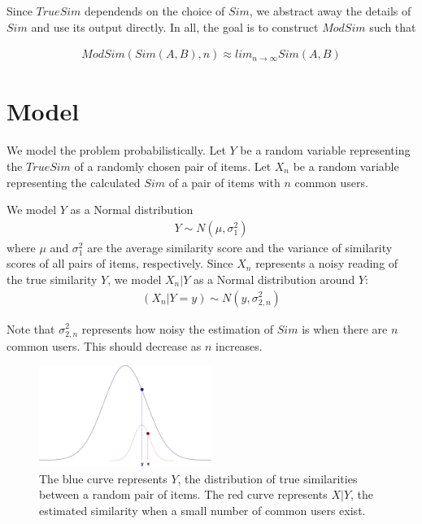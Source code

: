 \documentclass[11pt]{article}
\begin{document}
Since $TrueSim$ dependends on the choice of $Sim$, we abstract away the details
of $Sim$ and use its output directly. In all, the goal is to construct $ModSim$
such that

\begin{align}
ModSim(Sim(A, B), n) \approx lim_{n\to\infty}Sim(A, B)
\end{align}

\section*{Model}

We model the problem probabilistically. Let $Y$ be a random variable
representing the $TrueSim$ of a randomly chosen pair of items. Let $X_n$ be a
random variable representing the calculated $Sim$ of a pair of items with $n$
common users.

We model $Y$ as a Normal distribution 
\begin{align}
Y \sim N(\mu, \sigma_{1}^2)
\end{align}
where $\mu$ and $\sigma_{1}^2$ are the average similarity score and the variance
of similarity scores of all pairs of items, respectively. Since $X_n$ represents
a noisy reading of the true similarity $Y$, we model $X_n | Y$ as a Normal
distribution around $Y$:
\begin{align}
(X_n | Y=y) \sim N(y, \sigma_{2, n}^2)
\end{align}

Note that $\sigma_{2, n}^2$ represents how noisy the estimation of $Sim$ is when
there are $n$ common users. This should decrease as $n$ increases.

\begin{figure}[!htbp]
    \centering
    \includegraphics[width=0.5\textwidth]{twonormals.png}
	\caption{The blue curve represents $Y$, the distribution of true
    similarities between a random pair of items. The red curve represents $X|Y$,
    the estimated similarity when a small number of common users exist.}
    \label{fig:two_normals}
\end{figure}
\end{document}
